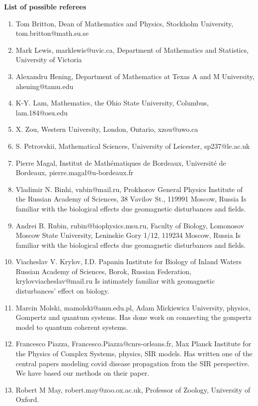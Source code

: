 \documentclass[11pt,a4paper,roman]{moderncv}
\begin{document}
\textbf{List of possible referees}
\begin{enumerate}
\item Tom Britton, Dean of Mathematics and Physics, Stockholm University, tom.britton@math.su.se
\item Mark Lewis, marklewis@uvic.ca, Department of Mathematics and Statistics, University of Victoria
\item Alexandru Hening, Department of Mathematics at Texas A and M University,  ahening@tamu.edu
\item K-Y. Lam, Mathematics,  the Ohio State University, Columbus, lam.184@osu.edu 
\item X. Zou, Western University, London, Ontario, xzou@uwo.ca
\item S. Petrovskii, Mathematical Sciences, University of Leicester, sp237@le.ac.uk
\item Pierre Magal, Institut de Mathématiques de Bordeaux, Université de Bordeaux, pierre.magal@u-bordeaux.fr 
\item Vladimir N. Binhi, vnbin@mail.ru, Prokhorov General Physics Institute of the Russian Academy of Sciences, 38 Vavilov St., 119991 Moscow, Russia
Is familiar with the biological effects due geomagnetic disturbances and fields.
\item Andrei B. Rubin, rubin@biophysics.msu.ru, Faculty of Biology, Lomonosov Moscow State University, Leninskie Gory 1/12, 119234 Moscow, Russia
Is familiar with the biological effects due geomagnetic disturbances and fields.
\item Viacheslav V. Krylov, I.D. Papanin Institute for Biology of Inland Waters Russian Academy of Sciences, Borok, Russian Federation, krylovviacheslav@mail.ru
Is intimately familiar with geomagnetic disturbances' effect on biology.
\item Marcin Molski, mamolski@amu.edu.pl, Adam Mickiewicz University, physics, Gompertz and quantum systems. Has done work on connecting the gompertz model to quantum coherent systems.
\item Francesco Piazza, Francesco.Piazza@cnrs-orleans.fr, Max Planck Institute for the Physics of Complex Systems, physics, SIR models.
Has written one of the central papers modeling covid disease propagation from the SIR perspective. We have based our methods on their paper.
\item Robert M May, robert.may@zoo.ox.ac.uk, Professor of Zoology, University of Oxford.
\end{enumerate}
\end{document}

